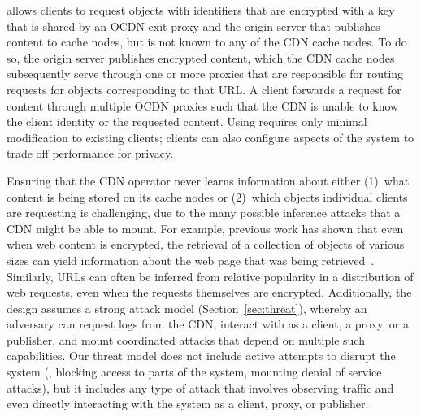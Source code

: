\system{} allows clients to request objects with identifiers that
are encrypted with a key that is shared by an OCDN exit proxy and the origin server
that publishes content to cache nodes, but is not known to any of the CDN
cache nodes. To do so, the origin server publishes encrypted content, 
which the CDN cache nodes subsequently serve through one or more proxies that are responsible for routing requests for objects corresponding to that URL.  A client forwards a request for content through multiple OCDN proxies such that the CDN is unable to know the client identity or the requested content. Using \system{} requires only minimal modification to existing clients; clients can also configure aspects of the system to trade off performance for privacy.

Ensuring that the CDN operator never learns information about either (1)~what
content is being stored on its cache nodes or (2)~which objects individual
clients are requesting is challenging, due to the many possible inference
attacks that a CDN might be able to mount. For example, previous work has
shown that even when web content is encrypted, the retrieval of a collection
of objects of various sizes can yield information about the web page that was
being retrieved~\cite{panchenko2016website, cai2012touching}. Similarly, URLs
can often be inferred from relative popularity in a distribution of web
requests, even when the requests themselves are encrypted. Additionally, the
\system{} design assumes a strong attack model (Section~\ref{sec:threat}),
whereby an adversary can request logs from the CDN, interact with \system{} as
a client, a proxy, or a publisher, and mount coordinated attacks that depend on
multiple such capabilities. Our threat model does not include active attempts
to disrupt the system (\eg, blocking access to parts of the system, mounting
denial of service attacks), but it includes any type of attack
that involves observing traffic and even directly interacting with the system
as a client, proxy, or publisher.


